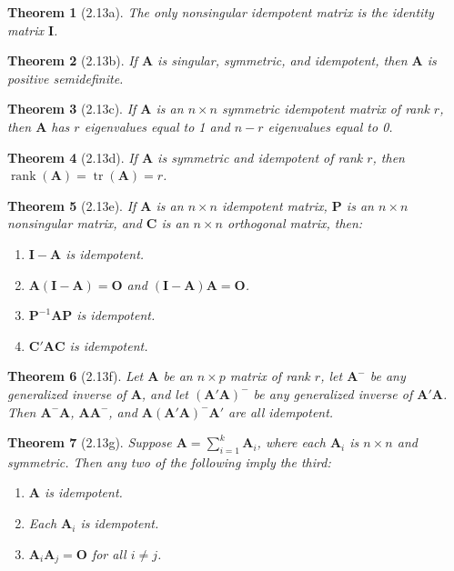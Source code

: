 \documentclass{article}
\newtheorem{theorem}{Theorem}[section]
\begin{document}
\begin{theorem}[2.13a]
The only nonsingular idempotent matrix is the identity matrix $\mathbf{I}$.
\end{theorem}

\begin{theorem}[2.13b]
If $\mathbf{A}$ is singular, symmetric, and idempotent, then $\mathbf{A}$ is positive semidefinite.
\end{theorem}

\begin{theorem}[2.13c]
If $\mathbf{A}$ is an $n \times n$ symmetric idempotent matrix of rank $r$, then $\mathbf{A}$ has $r$ eigenvalues equal to 1 and $n-r$ eigenvalues equal to 0.
\end{theorem}

\begin{theorem}[2.13d]
If $\mathbf{A}$ is symmetric and idempotent of rank $r$, then $\operatorname{rank}(\mathbf{A}) = \operatorname{tr}(\mathbf{A}) = r$.
\end{theorem}

\begin{theorem}[2.13e]
If $\mathbf{A}$ is an $n \times n$ idempotent matrix, $\mathbf{P}$ is an $n \times n$ nonsingular matrix, and $\mathbf{C}$ is an $n \times n$ orthogonal matrix, then:
\begin{enumerate}[label=(\roman*)]
\item $\mathbf{I} - \mathbf{A}$ is idempotent.
\item $\mathbf{A}(\mathbf{I}-\mathbf{A}) = \mathbf{O}$ and $(\mathbf{I}-\mathbf{A})\mathbf{A} = \mathbf{O}$.
\item $\mathbf{P}^{-1}\mathbf{A}\mathbf{P}$ is idempotent.
\item $\mathbf{C}'\mathbf{A}\mathbf{C}$ is idempotent.
\end{enumerate}
\end{theorem}

\begin{theorem}[2.13f]
Let $\mathbf{A}$ be an $n \times p$ matrix of rank $r$, let $\mathbf{A}^{-}$ be any generalized inverse of $\mathbf{A}$, and let $(\mathbf{A}'\mathbf{A})^{-}$ be any generalized inverse of $\mathbf{A}'\mathbf{A}$. Then $\mathbf{A}^{-}\mathbf{A}$, $\mathbf{A}\mathbf{A}^{-}$, and $\mathbf{A}(\mathbf{A}'\mathbf{A})^{-}\mathbf{A}'$ are all idempotent.
\end{theorem}

\begin{theorem}[2.13g]
Suppose $\mathbf{A} = \sum_{i=1}^{k} \mathbf{A}_i$, where each $\mathbf{A}_i$ is $n \times n$ and symmetric. Then any two of the following imply the third:
\begin{enumerate}[label=(\roman*)]
\item $\mathbf{A}$ is idempotent.
\item Each $\mathbf{A}_i$ is idempotent.
\item $\mathbf{A}_i\mathbf{A}_j = \mathbf{O}$ for all $i \neq j$.
\end{enumerate}
\end{theorem}
\end{document}
